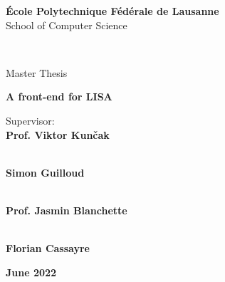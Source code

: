 \begin{center}
{\LARGE \textbf{École Polytechnique Fédérale de Lausanne}} \\
\vspace{0.2cm}
{\Large {School of Computer Science}} \\
\vspace{1cm}

 \\
\vspace{0.8cm}

{\Large {Master Thesis}} \\
\vspace{1cm}

{\LARGE \textbf{A front-end for LISA}} \\
\vspace{1cm}

\end{center}

\begin{multicols}{2}
\noindent \large{Supervisor:} \\
\large{\textbf{Prof. Viktor Kunčak}} \\
\vspace{0.1cm}

 \\
\large{\textbf{Simon Guilloud}} \\
\vspace{0.1cm}

 \\
\large{\textbf{Prof. Jasmin Blanchette}} \\
\vspace{0.1cm}
\columnbreak

 \\
\large{\textbf{Florian Cassayre}} \\
\end{multicols}
\vspace{2cm}

\begin{center}
  \large{\textbf{June 2022}}
\end{center}
